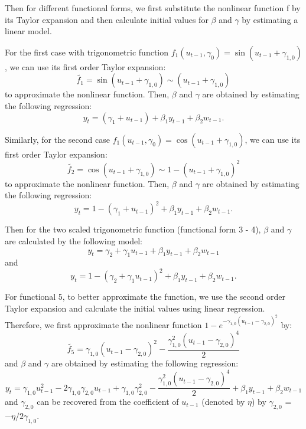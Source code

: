 \documentclass[a4paper,12pt,times,numbered,print,index]{report}
\numberwithin{equation}{section}
\begin{document}
	
	Then for different functional forms, we first substitute the nonlinear function f by its Taylor expansion and then calculate initial values for $\beta$ and $\gamma$ by estimating a linear model.
	
	For the first case with trigonometric function $f_{1}\left( u_{t-1},\gamma _{0}\right) =\sin \left( u_{t-1}+\gamma_{1,0}\right)$, we can use its first order Taylor expansion: 
	$$
	\tilde{f_1} = \sin \left( u_{t-1}+\gamma_{1,0}\right) \sim \left( u_{t-1}+\gamma_{1,0}\right) 
	$$ 
	to approximate the nonlinear function. Then, $\beta$ and $\gamma$ are obtained by estimating the following regression:
	$$
	y_t = \left( \gamma_{1} + u_{t-1}\right)  + \beta_{1}y_{t-1} + \beta_2w_{t-1}.
	$$
	
	
	Similarly, for the second case $f_{1}\left( u_{t-1},\gamma _{0}\right) =\cos \left( u_{t-1}+\gamma_{1,0}\right)$, we can use its first order Taylor expansion: 
	$$
	\tilde{f_2} = \cos \left( u_{t-1}+\gamma_{1,0}\right) \sim 1 - \left( u_{t-1}+\gamma_{1,0}\right)^2
	$$ 
	to approximate the nonlinear function. Then, $\beta$ and $\gamma$ are obtained by estimating the following regression:
	$$
	y_t = 1 - \left( \gamma_{1} + u_{t-1}\right)^2  + \beta_{1}y_{t-1} + \beta_2w_{t-1}.
	$$
	
	Then for the two scaled trigonometric function (functional form 3 - 4), $\beta$ and $\gamma$ are calculated by the following model:
	$$
	y_t = \gamma_{2}  + \gamma_{1}u_{t-1} + \beta_{1}y_{t-1} + \beta_2w_{t-1}
	$$
	and 
	$$
	y_t = 1 - \left( \gamma_{2} + \gamma_{1}u_{t-1}\right)^2  + \beta_{1}y_{t-1} + \beta_2w_{t-1}.
	$$
	
	
	
	For functional 5, to better approximate the function, we use the second order Taylor expansion and calculate the initial values using linear regression. Therefore, we first approximate the nonlinear function $1 - e^{-\gamma_{1,0}\left(u_{t-1}-\gamma_{2,0}\right)^{2}}$ by:
	$$
	\tilde{f_5} = \gamma_{1,0}(u_{t-1} - \gamma_{2,0})^2 - \dfrac{\gamma_{1,0}^2(u_{t-1} - \gamma_{2,0})^4}{2}
	$$
	and $\beta$ and $\gamma$ are obtained by estimating the following regression:
	$$
	y_t = \gamma_{1,0}u_{t-1}^2 - 2\gamma_{1,0}\gamma_{2,0}u_{t-1} + \gamma_{1,0}\gamma_{2,0}^2 - \dfrac{\gamma_{1,0}^2(u_{t-1} - \gamma_{2,0})^4}{2} + \beta_{1}y_{t-1} + \beta_2w_{t-1}
	$$
	and $\gamma_{2,0}$ can be recovered from the coefficient of $u_{t-1}$ (denoted by $\eta$) by $\gamma_{2,0}$ = $-\eta/2\gamma_{1,0}$.
	
\end{document}
